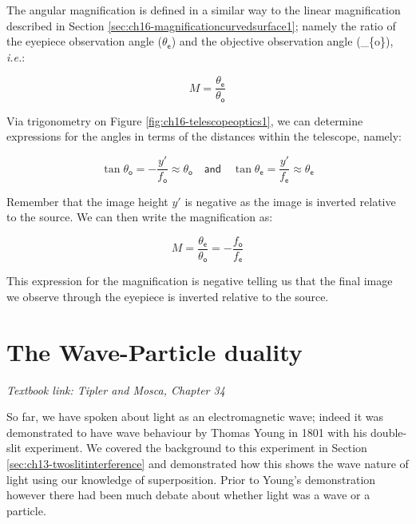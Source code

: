 \documentclass[
]{book}
\begin{document}
The angular magnification is defined in a similar way to the linear magnification described in Section \ref{sec:ch16-magnificationcurvedsurface1}; namely the ratio of the eyepiece observation angle (\(\theta_{\textsf{e}}\)) and the objective observation angle (\theta\_\{\textsf{o}\}), \emph{i.e.}:

\begin{equation}
M = \frac{\theta_{\textsf{e}}}{\theta_{\textsf{o}}}
\end{equation}

Via trigonometry on Figure \ref{fig:ch16-telescopeoptics1}, we can determine expressions for the angles in terms of the distances within the telescope, namely:

\begin{equation}
\tan \theta_{\textsf{o}} = -\frac{y'}{f_{\textsf{o}}} \approx \theta_{\textsf{o}} \quad \textsf{and} \quad \tan \theta_{\textsf{e}} = \frac{y'}{f_{\textsf{e}}} \approx \theta_{\textsf{e}}
\end{equation}

Remember that the image height \(y'\) is negative as the image is inverted relative to the source. We can then write the magnification as:

\begin{equation}
M = \frac{\theta_{\textsf{e}}}{\theta_{\textsf{o}}} = -\frac{f_{\textsf{o}}}{f_{\textsf{e}}}
\end{equation}

This expression for the magnification is negative telling us that the final image we observe through the eyepiece is inverted relative to the source.

\hypertarget{sec:ch17-waveparticle}{%
\chapter{The Wave-Particle duality}\label{sec:ch17-waveparticle}}

\emph{Textbook link: Tipler and Mosca, Chapter 34}

So far, we have spoken about light as an electromagnetic wave; indeed it was demonstrated to have wave behaviour by Thomas Young in 1801 with his double-slit experiment. We covered the background to this experiment in Section \ref{sec:ch13-twoslitinterference} and demonstrated how this shows the wave nature of light using our knowledge of superposition. Prior to Young's demonstration however there had been much debate about whether light was a wave or a particle.
\end{document}
